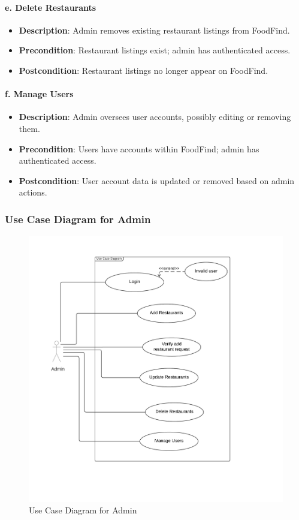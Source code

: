 \documentclass[12pt, a4paper, oneside]{article}
\begin{document}
\paragraph{e. Delete Restaurants}
\begin{itemize}
    \item \textbf{Description}: Admin removes existing restaurant listings from FoodFind.
    \item \textbf{Precondition}: Restaurant listings exist; admin has authenticated access.
    \item \textbf{Postcondition}: Restaurant listings no longer appear on FoodFind.
\end{itemize}

\paragraph{f. Manage Users}
\begin{itemize}
    \item \textbf{Description}: Admin oversees user accounts, possibly editing or removing them.
    \item \textbf{Precondition}: Users have accounts within FoodFind; admin has authenticated access.
    \item \textbf{Postcondition}: User account data is updated or removed based on admin actions.
\end{itemize}


\subsubsection{Use Case Diagram for Admin}
\begin{figure}[H]
    \centering
    \includegraphics[width=\textwidth,height=\textheight,keepaspectratio]{images/useadmin.jpg}
    \caption{Use Case Diagram for Admin}
    \label{fig:useadmin}
\end{figure}
\pagebreak
\end{document}

